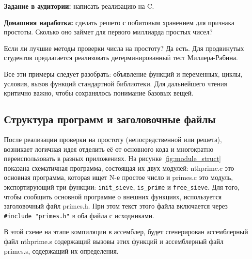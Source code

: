\documentclass[a4paper,12pt,oneside]{book}
\newif\ifanswers
\begin{document}
\textbf{Задание в аудитории:} написать реализацию на C.

\ifanswers
Возможный ответ:

\begin{lstlisting}
int *
init_sieve (int nofprimes)
{
  int i, j;
  int *retval;

  retval = calloc (nofprimes, sizeof (int));

  for (i = 2; i * i < nofprimes; ++i)
    if (retval[i] == 0)
      for (j = i * i; j < nofprimes; j += i)
        retval[j] = 1;

  return retval;
}
\end{lstlisting}

Хорош ли этот ответ? В общем да, но следует обратить внимание, что он тратит примерно в 32 раза больше памяти, чем реально нужно для хранения однобитовых признаков.
\fi

\textbf{Домашняя наработка:} сделать решето с побитовым хранением для признака простоты. Сколько оно займет для первого миллиарда простых чисел?

Если ли лучшие методы проверки числа на простоту? Да есть. Для продвинутых студентов предлагается реализовать детерминированный тест Миллера-Рабина. 

Все эти примеры следует разобрать: объявление функций и переменных, циклы, условия, вызов функций стандартной библиотеки. Для дальнейшего чтения критично важно, чтобы сохранялось понимание базовых вещей.

\subsection{Структура программ и заголовочные файлы}\label{ProgramStructure}

После реализации проверки на простоту (непосредственной или решета), возникает логичная идея отделить её от основного кода и многократно переиспользовать в разных приложениях. На рисунке \ref{fig:module_struct} показана схематичная программа, состоящая их двух модулей: nthprime.c это основная программа, которая ищет N-е простое число и primes.c это модуль, экспортирующий три функции: \lstinline!init_sieve!, \lstinline!is_prime! и \lstinline!free_sieve!. Для того, чтобы сообщить основной программе о внешних функциях, используется заголовочный файл primes.h. При этом текст этого файла включается через \lstinline!#include "primes.h"! в оба файла с исходниками.

В этой схеме на этапе компиляции в ассемблер, будет сгенерирован ассемблерный файл nthprime.s содержащий вызовы этих функций и ассемблерный файл primes.s, содержащий их определения.
\end{document}
